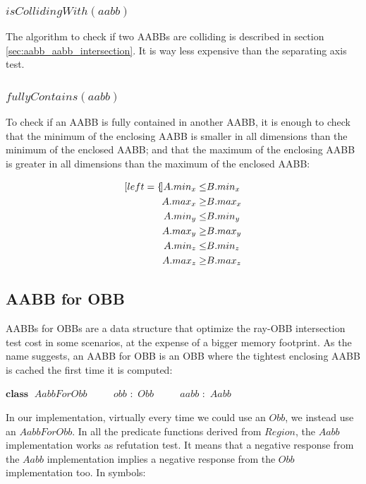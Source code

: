 \documentclass{PoliMi_MasterThesis}
\newcommand*\Class[1]{\State $\textbf{class} \;$ #1}
\newcommand*\Member[2]{\State $\qquad$ #1 $:$ #2}
\begin{document}
\subsubsection*{$isCollidingWith(aabb)$}
The algorithm to check if two AABBs are colliding is described in section \ref{sec:aabb_aabb_intersection}. It is way less expensive than the separating axis test.

\subsubsection*{$fullyContains(aabb)$}
To check if an AABB is fully contained in another AABB, it is enough to check that the minimum of the enclosing AABB is smaller in all dimensions than the minimum of the enclosed AABB; and that the maximum of the enclosing AABB is greater in all dimensions than the maximum of the enclosed AABB:

\begin{subequations}
	\begin{align*}[left=\empheqlbrace]
		A.min_x \leq& B.min_x \\
		A.max_x \geq& B.max_x \\
		A.min_y \leq& B.min_y \\
		A.max_y \geq& B.max_y \\
		A.min_z \leq& B.min_z \\
		A.max_z \geq& B.max_z
	\end{align*}
\end{subequations}

\subsection{AABB for OBB} \label{ssec:aabb_for_obb}
AABBs for OBBs are a data structure that optimize the ray-OBB intersection test cost in some scenarios, at the expense of a bigger memory footprint. As the name suggests, an AABB for OBB is an OBB where the tightest enclosing AABB is cached the first time it is computed:
\begin{algorithm}[H]
	\begin{algorithmic}
		\Class{$AabbForObb$}
		\Member{$obb$}{$Obb$}
		\Member{$aabb$}{$Aabb$}
	\end{algorithmic}
\end{algorithm} 

In our implementation, virtually every time we could use an $Obb$, we instead use an $AabbForObb$. In all the predicate functions derived from $Region$, the $Aabb$ implementation works as refutation test. It means that a negative response from the $Aabb$ implementation implies a negative response from the $Obb$ implementation too. In symbols:
\end{document}

